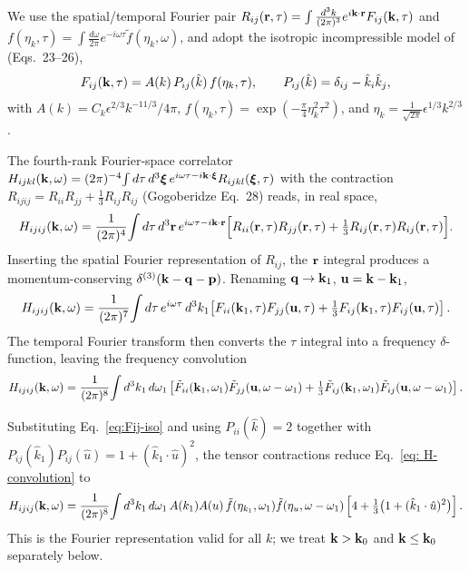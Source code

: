 \documentclass[10pt,prd,aps,nobibnotes,superscriptaddress,preprintnumbers,notitlepage]{revtex4-1}
\newcommand{\khat}{\hat{k}}
\newcommand{\br}{{\bf r}}
\newcommand{\bq}{{\bf q}}
\newcommand{\bp}{{\bf p}}
\newcommand{\kb}{{\bf k}}
\newcommand{\bxi}{{\boldsymbol{\xi}}}
\newcommand{\ub}{{\bf u}}
\newcommand{\tf}{\tilde{f}}
\begin{document}
We use the spatial/temporal Fourier pair $R_{ij}(\br,\tau) = \int \tfrac{d^3k}{(2\pi)^3}e^{i\kb\cdot\br}F_{ij}(\kb,\tau)$ and $f(\eta_k,\tau)=\int\tfrac{d\omega}{2\pi}e^{-i\omega\tau}\tf(\eta_k,\omega)$, and adopt the isotropic incompressible model of \cite{Gogoberidze:2007an} (Eqs.~23--26),
\begin{equation}
  F_{ij}(\kb,\tau) = A(k)\,P_{ij}(\khat)\,f(\eta_k,\tau),
  \qquad
  P_{ij}(\khat)=\delta_{ij}-\khat_i\khat_j,
  \label{eq:Fij-iso}
\end{equation}
with $A(k)=C_k\epsilon^{2/3}k^{-11/3}/4\pi$, $f(\eta_k,\tau)=\exp(-\tfrac{\pi}{4}\eta_k^2\tau^2)$, and $\eta_k=\tfrac{1}{\sqrt{2\pi}}\epsilon^{1/3}k^{2/3}$.

The fourth-rank Fourier-space correlator
$H_{ijkl}(\kb,\omega)=(2\pi)^{-4}\!\int d\tau\,d^3\bxi\,e^{i\omega\tau-i\kb\cdot\bxi}R_{ijkl}(\bxi,\tau)$ with the contraction
$R_{ijij}=R_{ii}R_{jj}+\tfrac{1}{3}R_{ij}R_{ij}$ (Gogoberidze Eq.~28) reads, in real space,
\begin{equation}
  H_{ijij}(\kb,\omega) = \frac{1}{(2\pi)^4}\!\int d\tau\,d^3\br\,e^{i\omega\tau-i\kb\cdot\br}
  \Bigl[R_{ii}(\br,\tau)R_{jj}(\br,\tau)+\tfrac{1}{3}R_{ij}(\br,\tau)R_{ij}(\br,\tau)\Bigr].
  \label{eq: main}
\end{equation}
Inserting the spatial Fourier representation of $R_{ij}$, the $\br$ integral produces a momentum-conserving $\delta^{(3)}(\kb-\bq-\bp)$. Renaming $\bq\to\kb_1$, $\ub=\kb-\kb_1$,
\begin{equation}
  H_{ijij}(\kb,\omega) = \frac{1}{(2\pi)^7}\!\int d\tau\,e^{i\omega\tau}\,
  d^3k_1\!\left[F_{ii}(\kb_1,\tau)F_{jj}(\ub,\tau)+\tfrac{1}{3}F_{ij}(\kb_1,\tau)F_{ij}(\ub,\tau)\right].
  \label{eq: H-after-r}
\end{equation}
The temporal Fourier transform then converts the $\tau$ integral into a frequency $\delta$-function, leaving the frequency convolution
\begin{equation}
  H_{ijij}(\kb,\omega) = \frac{1}{(2\pi)^8}\!\int d^3k_1\,d\omega_1
  \left[\tilde F_{ii}(\kb_1,\omega_1)\tilde F_{jj}(\ub,\omega-\omega_1)
  +\tfrac{1}{3}\tilde F_{ij}(\kb_1,\omega_1)\tilde F_{ij}(\ub,\omega-\omega_1)\right].
  \label{eq: H-convolution}
\end{equation}

Substituting Eq.~\eqref{eq:Fij-iso} and using $P_{ii}(\khat)=2$ together with $P_{ij}(\khat_1)P_{ij}(\hat u)=1+(\khat_1\cdot\hat u)^2$, the tensor contractions reduce Eq.~\eqref{eq: H-convolution} to
\begin{equation}
  H_{ijij}(\kb,\omega) = \frac{1}{(2\pi)^8}\!\int d^3k_1\,d\omega_1\,
  A(k_1)A(u)\,\tf(\eta_{k_1},\omega_1)\tf(\eta_u,\omega-\omega_1)
  \left[4+\tfrac{1}{3}\bigl(1+(\khat_1\cdot\hat u)^2\bigr)\right].
  \label{eq: H-with-P}
\end{equation}
This is the Fourier representation valid for all $k$; we treat $\kb > \kb_0$ and $\kb \leq \kb_0$ separately below.
\end{document}
